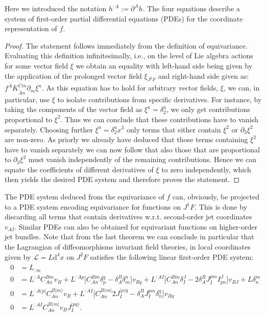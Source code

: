 Here we introduced the notation $h^{:A} := \partial^A h$. The four equations describe a system of first-order partial differential equations (PDEs) for the coordinate representation of $f$. 
\begin{proof}
The statement follows immediately from the definition of equivariance. Evaluating this definition infinitesimally, i.e., on the level of Lie algebra actions for some vector field $\xi$ we obtain an equality with left-hand side being given by the application of the prolonged vector field $\xi_{J^2F}$ and right-hand side given as: $f^{\tilde{A}}K_{\tilde{A}n}^{\tilde{C}m} \partial_m \xi^n$. As this equation has to hold for arbitrary vector fields, $\xi$, we can, in particular, use $\xi$ to isolate contributions from specific derivatives. 
For instance, by taking the components of the vector field as $\xi^a = \delta^a_2$, we only get contributions proportional to $\xi^2$. Thus we can conclude that these contributions have to vanish separately. Choosing further $\xi^a = \delta^a_2 x^3$ only terms that either contain $\xi^2$ or $\partial_3 \xi^2$ are non-zero. As priorly we already have deduced that those terms containing $\xi^2$ have to vanish separately we can now follow that also those that are proportional to $\partial_3 \xi ^2$ must vanish independently of the remaining contributions.
Hence we can equate the coefficients of different derivatives of $\xi$ to zero independently, which then yields the desired PDE system and therefore proves the statement.  
\end{proof}
The PDE system deduced from the equivariance of $f$ can, obviously, be projected to a PDE system encoding equivariance for functions on $J^1F$. This is done by discarding all terms that contain derivatives w.r.t. second-order jet coordinates $v_{AI}$. 
Similar PDEs can also be obtained for equivariant functions on higher-order jet bundles.
Note that from the last theorem we can conclude in particular that the Lagrangian of diffeomorphisms invariant field theories, in local coordinates given by $\mathcal{L} = L \mathrm{d}^4x$ on $J^2F$ satisfies the following linear first-order PDE system:  
\begin{align}\label{DiffeoEqn}
\begin{aligned}
    0 &= L_{:m} \\
    0 &= L^{:A} C_{An}^{Bm} v_B + L^{:Ap} \bigl[ C_{An}^{Bm} \delta_p^q - \delta_A^B \delta_m^n \bigr] v_{Bq} + L^{:AI} \bigl[ C_{An}^{Bm} \delta_I^J - 2 \delta_A^B J_I^{pm} I^J_{pn}  \bigr] v_{BJ} + L \delta^m_n \\
    0 &= L^{:A(p\vert}C_{An}^{B \vert m)} v_B + L^{: AI} \bigl[ C_{An}^{B(m\vert} 2 J_I^{\vert p) q} - \delta^B_A J_I ^{pm} \delta_n^q \bigr] v_{Bq} \\
    0 &= L^{:AI} C_{An}^{B(m\vert} v_B J_I^{\vert p q )}.
    \end{aligned}
\end{align}
